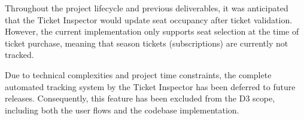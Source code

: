 \documentclass{article}
\begin{document}
\par Throughout the project lifecycle and previous deliverables, it was anticipated that the Ticket Inspector would update seat occupancy after ticket validation. However, the current implementation only supports seat selection at the time of ticket purchase, meaning that season tickets (subscriptions) are currently not tracked.

Due to technical complexities and project time constraints, the complete automated tracking system by the Ticket Inspector has been deferred to future releases. Consequently, this feature has been excluded from the D3 scope, including both the user flows and the codebase implementation.
\end{document}
